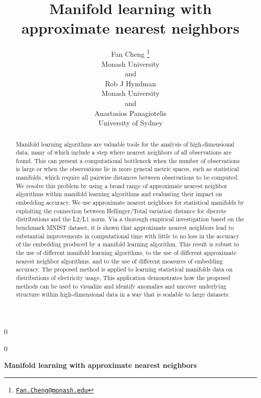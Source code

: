 \documentclass[12pt]{article}
\newcommand{\blind}{0}
\begin{document}
\def\spacingset#1{\renewcommand{\baselinestretch}%
{#1}\small\normalsize} \spacingset{1}



\blind
{
  \title{\bf Manifold learning with approximate nearest neighbors}

  \author{
        Fan Cheng \thanks{\href{mailto:Fan.Cheng@monash.edu}{\nolinkurl{Fan.Cheng@monash.edu}}} \\
    Monash University\\
     and \\     Rob J Hyndman \\
    Monash University\\
     and \\     Anastasios Panagiotelis \\
    University of Sydney\\
      }
  \maketitle
} \fi

\blind
{
  \bigskip
  \bigskip
  \bigskip
  \begin{center}
    {\LARGE\bf Manifold learning with approximate nearest neighbors}
  \end{center}
  \medskip
} \fi

\bigskip
\begin{abstract}
Manifold learning algorithms are valuable tools for the analysis of high-dimensional data, many of which include a step where nearest neighbors of all observations are found. This can present a computational bottleneck when the number of observations is large or when the observations lie in more general metric spaces, such as statistical manifolds, which require all pairwise distances between observations to be computed. We resolve this problem by using a broad range of approximate nearest neighbor algorithms within manifold learning algorithms and evaluating their impact on embedding accuracy. We use approximate nearest neighbors for statistical manifolds by exploiting the connection between Hellinger/Total variation distance for discrete distributions and the L2/L1 norm. Via a thorough empirical investigation based on the benchmark MNIST dataset, it is shown that approximate nearest neighbors lead to substantial improvements in computational time with little to no loss in the accuracy of the embedding produced by a manifold learning algorithm. This result is robust to the use of different manifold learning algorithms, to the use of different approximate nearest neighbor algorithms, and to the use of different measures of embedding accuracy. The proposed method is applied to learning statistical manifolds data on distributions of electricity usage. This application demonstrates how the proposed methods can be used to visualize and identify anomalies and uncover underlying structure within high-dimensional data in a way that is scalable to large datasets.
\end{abstract}
\end{document}
